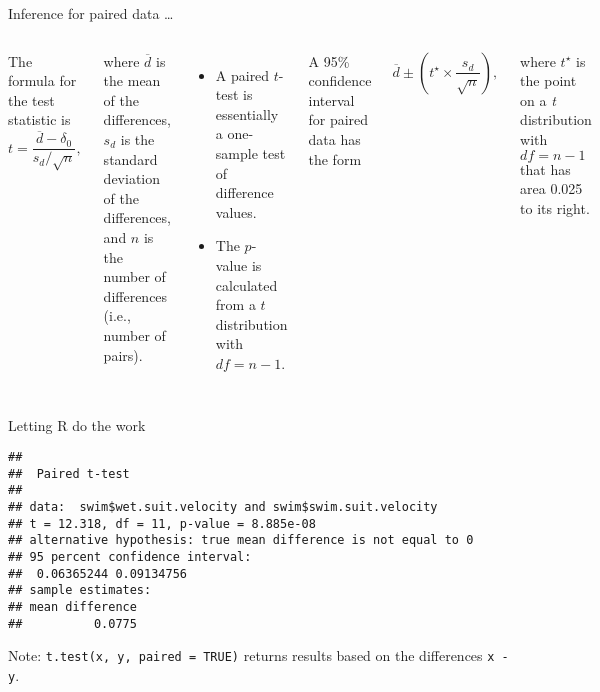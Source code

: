 \documentclass[
  ignorenonframetext,
  aspectratio=169]{beamer}
\newenvironment{Shaded}{\begin{snugshade}}{\end{snugshade}}
\newcommand{\AttributeTok}[1]{\textcolor[rgb]{0.13,0.29,0.53}{#1}}
\newcommand{\CommentTok}[1]{\textcolor[rgb]{0.56,0.35,0.01}{\textit{#1}}}
\newcommand{\ConstantTok}[1]{\textcolor[rgb]{0.56,0.35,0.01}{#1}}
\newcommand{\FunctionTok}[1]{\textcolor[rgb]{0.13,0.29,0.53}{\textbf{#1}}}
\newcommand{\NormalTok}[1]{#1}
\newcommand{\SpecialCharTok}[1]{\textcolor[rgb]{0.81,0.36,0.00}{\textbf{#1}}}
\newcommand{\StringTok}[1]{\textcolor[rgb]{0.31,0.60,0.02}{#1}}
\newcommand{\columnsbegin}{\begin{columns}}
\newcommand{\columnsend}{\end{columns}}
\begin{document}
\begin{frame}{Inference for paired data \ldots}
\protect\hypertarget{inference-for-paired-data-1}{}
\columnsbegin


\footnotesize

The formula for the test statistic is
\[ t = \dfrac{\overline{d} -\delta_0}{s_d /\sqrt{n}},\]

where \(\overline{d}\) is the mean of the differences, \(s_d\) is the
standard deviation of the differences, and \(n\) is the number of
differences (i.e., number of pairs).

\begin{itemize}
\item
  A paired \(t\)-test is essentially a one-sample test of difference
  values.
\item
  The \(p\)-value is calculated from a \(t\) distribution with
  \(df = n - 1\).
\end{itemize}


\footnotesize

A 95\% confidence interval for paired data has the form

\[\overline{d} \pm \left( t^{\star} \times \dfrac{s_d}{\sqrt{n}} \right) ,\]

where \(t^{\star}\) is the point on a \emph{t} distribution with
\(df = n - 1\) that has area 0.025 to its right.

\columnsend
\end{frame}

\begin{frame}[fragile]{Letting \textsf{R} do the work}
\protect\hypertarget{letting-do-the-work}{}
\scriptsize

\begin{Shaded}
\end{Shaded}

\begin{verbatim}
## 
##  Paired t-test
## 
## data:  swim$wet.suit.velocity and swim$swim.suit.velocity
## t = 12.318, df = 11, p-value = 8.885e-08
## alternative hypothesis: true mean difference is not equal to 0
## 95 percent confidence interval:
##  0.06365244 0.09134756
## sample estimates:
## mean difference 
##          0.0775
\end{verbatim}

Note: \texttt{t.test(x, y, paired = TRUE)} returns results based on the
differences \texttt{x - y}.
\end{frame}
\end{document}
